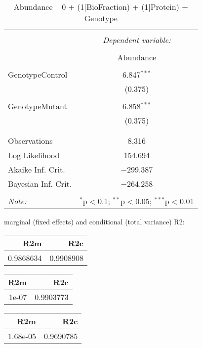 \documentclass[11pt]{report}
\begin{document}
\begin{table}[!htbp] \centering 
  \caption{Abundance ~ 0 + (1|BioFraction) + (1|Protein) + Genotype} 
  \label{} 
\begin{tabular}{@{\extracolsep{5pt}}lc} 
\\[-1.8ex]\hline 
\hline \\[-1.8ex] 
 & \multicolumn{1}{c}{\textit{Dependent variable:}} \\ 
\cline{2-2} 
\\[-1.8ex] & Abundance \\ 
\hline \\[-1.8ex] 
 GenotypeControl & 6.847$^{***}$ \\ 
  & (0.375) \\ 
  & \\ 
 GenotypeMutant & 6.858$^{***}$ \\ 
  & (0.375) \\ 
  & \\ 
\hline \\[-1.8ex] 
Observations & 8,316 \\ 
Log Likelihood & 154.694 \\ 
Akaike Inf. Crit. & $-$299.387 \\ 
Bayesian Inf. Crit. & $-$264.258 \\ 
\hline 
\hline \\[-1.8ex] 
\textit{Note:}  & \multicolumn{1}{r}{$^{*}$p$<$0.1; $^{**}$p$<$0.05; $^{***}$p$<$0.01} \\ 
\end{tabular} 
\end{table} 
marginal (fixed effects) and conditional (total variance) R2:

\begin{tabular}{r|r}
\hline
R2m & R2c\\
\hline
0.9868634 & 0.9908908\\
\hline
\end{tabular}

\begin{tabular}{r|r}
\hline
R2m & R2c\\
\hline
1e-07 & 0.9903773\\
\hline
\end{tabular}

\begin{tabular}{r|r}
\hline
R2m & R2c\\
\hline
1.68e-05 & 0.9690785\\
\hline
\end{tabular}
\end{document}
